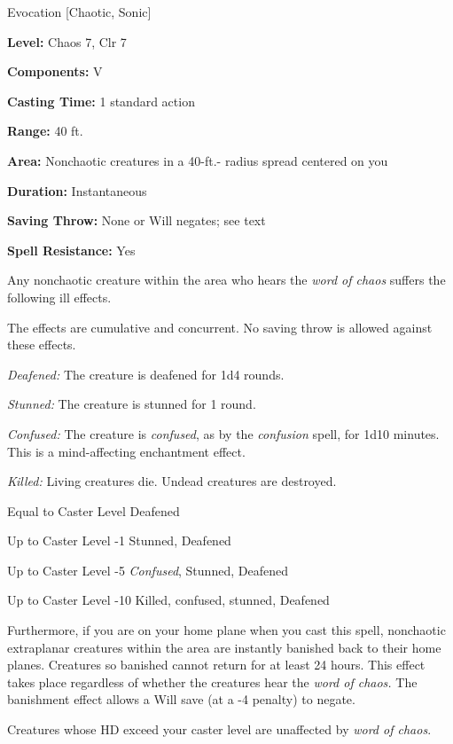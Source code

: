 
Evocation [Chaotic, Sonic]

\textbf{Level:} Chaos 7, Clr 7

\textbf{Components:} V

\textbf{Casting Time:} 1 standard action

\textbf{Range:} 40 ft.

\textbf{Area:} Nonchaotic creatures in a 40-ft.- radius spread centered on you

\textbf{Duration:} Instantaneous

\textbf{Saving Throw:} None or Will negates; see text

\textbf{Spell Resistance:} Yes

Any nonchaotic creature within the area who hears the \textit{word of chaos} suffers 
the following ill effects.

The effects are cumulative and concurrent. No saving throw is allowed against these 
effects.

\textit{Deafened:} The creature is deafened for 1d4 rounds.

\textit{Stunned:} The creature is stunned for 1 round.

\textit{Confused:} The creature is \textit{confused}, as by the \textit{confusion 
}spell, for 1d10 minutes. This is a mind-affecting enchantment effect.

\textit{Killed:} Living creatures die. Undead creatures are destroyed.

\begin{description*}
\item[Equal to Caster Level] Deafened
\item[Up to Caster Level -1] Stunned, Deafened
\item[Up to Caster Level -5] \textit{Confused}, Stunned, Deafened
\item[Up to Caster Level -10] Killed, confused, stunned, Deafened 
\end{description*}

Furthermore, if you are on your home plane when you cast this spell, nonchaotic 
extraplanar creatures within the area are instantly banished back to their home 
planes. Creatures so banished cannot return for at least 24 hours. This effect 
takes place regardless of whether the creatures hear the \textit{word of chaos. 
}The banishment effect allows a Will save (at a -4 penalty) to negate.

Creatures whose HD exceed your caster level are unaffected by \textit{word of chaos}.

